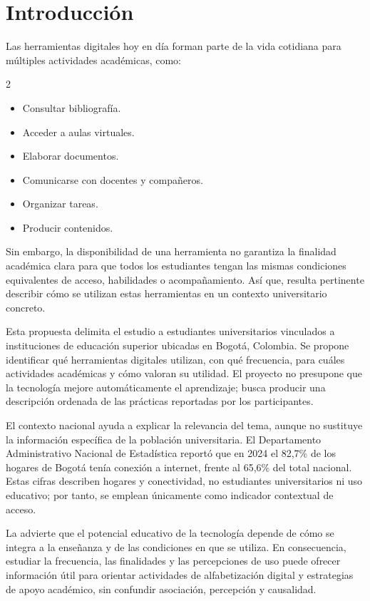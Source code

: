 \section{Introducción}
Las herramientas digitales hoy en día forman parte de la vida cotidiana para múltiples actividades académicas, como:

\begin{multicols}{2}
    \begin{itemize}
        \item  Consultar bibliografía.
        \item Acceder a aulas virtuales.
        \item Elaborar documentos.
        \item Comunicarse con docentes y compañeros.
        \item Organizar tareas.
        \item Producir contenidos.
    \end{itemize}
\end{multicols}
 
Sin embargo, la disponibilidad de una herramienta no garantiza la finalidad académica clara para que todos los estudiantes tengan las mismas condiciones equivalentes de acceso, habilidades o acompañamiento. Así que, resulta pertinente describir cómo se utilizan estas herramientas en un contexto universitario concreto.

Esta propuesta delimita el estudio a estudiantes universitarios vinculados a instituciones de educación
superior ubicadas en Bogotá, Colombia. Se propone identificar qué herramientas digitales utilizan, con qué
frecuencia, para cuáles actividades académicas y cómo valoran su utilidad. El proyecto no presupone que la
tecnología mejore automáticamente el aprendizaje; busca producir una descripción ordenada de las prácticas
reportadas por los participantes.

El contexto nacional ayuda a explicar la relevancia del tema, aunque no sustituye la información específica de la población universitaria. El Departamento Administrativo Nacional de Estadística \parencite{dane2025entic} reportó que en 2024 el 82,7\% de los hogares de Bogotá tenía conexión a internet, frente al 65,6\% del total nacional. Estas cifras describen hogares y conectividad, no estudiantes universitarios ni uso educativo; por tanto, se emplean únicamente como indicador contextual de acceso.

La \textcite{unesco2023tecnologia} advierte que el potencial educativo de la tecnología depende de cómo se integra a la enseñanza y de las condiciones en que se utiliza. En consecuencia, estudiar la frecuencia, las finalidades y las percepciones de uso puede ofrecer información útil para orientar actividades de alfabetización digital y estrategias de apoyo académico, sin confundir asociación, percepción y causalidad.

